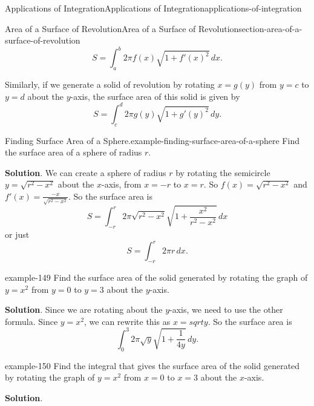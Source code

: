 \documentclass[oneside,10pt,]{book}
\numberwithin{equation}{section}
\begin{document}
\begin{chapterptx}{Applications of Integration}{}{Applications of Integration}{}{}{applications-of-integration}
\begin{sectionptx}{Area of a Surface of Revolution}{}{Area of a Surface of Revolution}{}{}{section-area-of-a-surface-of-revolution}
\begin{equation*}
S=\int_{a}^{b}2\pi f(x)\sqrt{1+f'(x)^{2}}\,dx.
\end{equation*}
%
\par
\hypertarget{p-664}{}%
Similarly, if we generate a solid of revolution by rotating \(x=g(y)\) from \(y=c\) to \(y=d\) about the \(y\)-axis, the surface area of this solid is given by%
\begin{equation*}
S=\int_{c}^{d}2\pi g(y)\sqrt{1+g'(y)^{2}}\,dy.
\end{equation*}
%
\begin{example}{Finding Surface Area of a Sphere.}{example-finding-surface-area-of-a-sphere}%
\hypertarget{p-665}{}%
Find the surface area of a sphere of radius \(r\).%
\par\smallskip%
\noindent\textbf{Solution}.\hypertarget{solution-144}{}\quad%
\hypertarget{p-666}{}%
We can create a sphere of radius \(r\) by rotating the semicircle \(y=\sqrt{r^{2}-x^{2}}\) about the \(x\)-axis, from \(x=-r\) to \(x=r\). So \(f(x)=\sqrt{r^{2}-x^{2}}\) and \(f'(x)=\displaystyle\frac{-x}{\sqrt{r^{2}-x^{2}}}\). So the surface area is%
\begin{equation*}
S=\int_{-r}^{r}2\pi\sqrt{r^{2}-x^{2}}\sqrt{1+\frac{x^{2}}{r^{2}-x^{2}}}\,dx
\end{equation*}
or just%
\begin{equation*}
S=\int_{-r}^{r}2\pi r \, dx.
\end{equation*}
%
\end{example}
\begin{example}{}{example-149}%
\hypertarget{p-667}{}%
Find the surface area of the solid generated by rotating the graph of \(y=x^{2}\) from \(y=0\) to \(y=3\) about the \(y\)-axis.%
\par\smallskip%
\noindent\textbf{Solution}.\hypertarget{solution-145}{}\quad%
\hypertarget{p-668}{}%
Since we are rotating about the \(y\)-axis, we need to use the other formula. Since \(y=x^{2}\), we can rewrite this as \(x=sqrt{y}\). So the surface area is%
\begin{equation*}
\int_{0}^{3}2\pi\sqrt{y}\sqrt{1+\frac{1}{4y}}\,dy.
\end{equation*}
%
\end{example}
\begin{example}{}{example-150}%
\hypertarget{p-669}{}%
Find the integral that gives the surface area of the solid generated by rotating the graph of \(y=x^{2}\) from \(x=0\) to \(x=3\) about the \(x\)-axis.%
\par\smallskip%
\noindent\textbf{Solution}.\hypertarget{solution-146}{}\quad%

\end{example}
\end{sectionptx}
\end{chapterptx}
\end{document}
